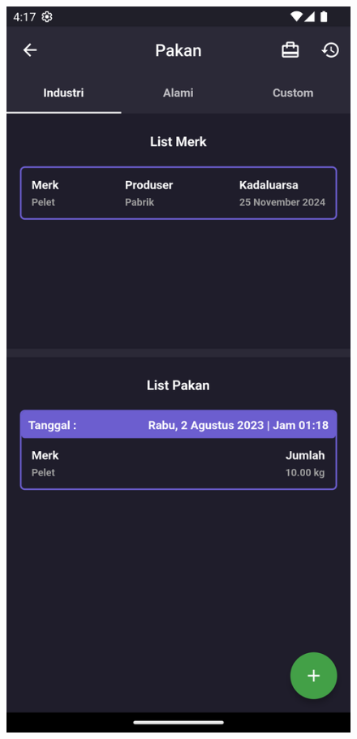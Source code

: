 \begin{spacing}{1.5}
\begin{enumerate}
\begin{enumerate}
\begin{itemize}
				\begin{figure}[H]
						\includegraphics[width=\linewidth]{gambar/sprint4/inv_pakan.png}

\end{figure}
\end{itemize}
\end{enumerate}
\end{enumerate}
\end{spacing}
